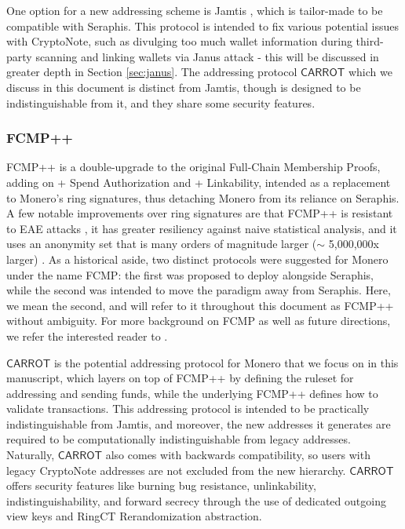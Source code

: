 \documentclass{article}
\theoremstyle{definition}
\newcommand{\6}{\mathbf}
\newcommand{\7}{\mathcal}
\renewcommand{\sf}[1]{{\mathsf{#1}}}
\newcommand{\carr}{$\sf{CARROT}$ }
\begin{document}
One option for a new addressing scheme is Jamtis \cite{Jamtis}, which is tailor-made to be compatible with Seraphis. 
This protocol is intended to fix various potential issues with CryptoNote, such as divulging too much wallet information during third-party scanning and linking wallets via Janus attack - this will be discussed in greater depth in Section \ref{sec:janus}. The addressing protocol \carr which we discuss in this document is distinct from Jamtis, though is designed to be indistinguishable from it, and they share some security features.
\medskip 




\subsubsection{FCMP++}\label{sec:fcmp}

FCMP++ \cite{FCMP} is a double-upgrade to the original Full-Chain Membership Proofs, adding on + Spend Authorization and + Linkability, intended as a replacement to Monero's ring signatures, thus detaching Monero from its reliance on Seraphis.  
A few notable improvements over ring signatures are that FCMP++ is resistant to EAE attacks \cite{BreakingMoneroEAE}, it has greater resiliency against naive statistical analysis, and it uses an anonymity set that is many orders of magnitude larger ($\sim$ 5,000,000x larger) \cite{FCMPDev}.
As a historical aside, two distinct protocols were suggested for Monero under the name FCMP: the first \cite{FCMP1} was proposed to deploy alongside Seraphis, while the second \cite{FCMP} was intended to move the paradigm away from Seraphis. 
Here, we mean the second, and will refer to it throughout this document as FCMP++ without ambiguity. 
For more background on FCMP as well as future directions, we refer the interested reader to \cite{CurveTrees,EllipticCurve,DiscLog,FCMPRetro,FCMPCCS}.
\medskip 



\medskip 




\carr is the potential addressing protocol for Monero that we focus on in this manuscript, which layers on top of FCMP++ by defining the ruleset for addressing and sending funds, while the underlying FCMP++ defines how to validate transactions.
This addressing protocol is intended to be practically indistinguishable from Jamtis, and moreover, the new addresses it generates are required to be computationally indistinguishable from legacy addresses. 
Naturally, \carr also comes with backwards compatibility, so users with legacy CryptoNote addresses are not excluded from the new hierarchy.
\carr offers security features like burning bug resistance, unlinkability, indistinguishability, and forward secrecy through the use of dedicated outgoing view keys and RingCT Rerandomization abstraction.
\end{document}
